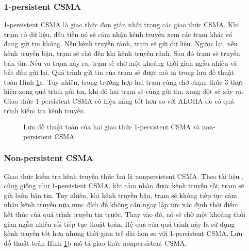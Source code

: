 \subsubsection{1-persistent CSMA}
1-persistent CSMA \cite{6} là giao thức đơn giản nhất trong các giao thức CSMA. Khi trạm có dữ liệu, đầu tiền nó sẽ cảm nhận kênh truyền xem các trạm khác có đang gửi tin không. Nếu kênh truyền rảnh, trạm sẽ gửi dữ liệu. Ngược lại, nếu kênh truyền bận, trạm sẽ chờ đến khi kênh truyền rảnh. Sau đó trạm sẽ truyền bản tin. Nếu va trạm xảy ra, trạm sẽ chờ một khoảng thời gian ngẫu nhiêu và bắt đầu gửi lại. Quá trình gửi tin của trạm sẽ được mô tả trong lưu đồ thuật toán Hình \ref{2CSMA}{}a. Tuy nhiên, trong trường hợp hai trạm cùng chờ chạm thức 3 thực hiện xong quá trình gửi tin, khi đó hai trạm sẽ cùng gửi tin, xung đột sẽ xảy ra. Giao thức 1-persistent CSMA có hiệu năng tốt hơn so với ALOHA do có quá trình kiểm tra kênh truyền.\\
\begin{figure}[h]
\centering
{}
\hfill
{}
\caption{Lưu đồ thuật toán của hai giao thức 1-persistent CSMA và non-persistent CSMA}
\label{2CSMA}
\end{figure} 
\subsubsection{Non-persistent CSMA}
Giao thức kiểm tra kênh truyền thức hai là nonpersistent CSMA. Theo tài liệu \cite{6}, cũng giống như 1-persistent CSMA, khi cảm nhận được kênh truyền rỗi, trạm sẽ gửi luôn bản tin. Tuy nhiên, khi kênh truyền bận, trạm sẽ không tiếp tục cảm nhận kênh truyền nữa mục đích để không cần ngay lập tức xác định thời điểm kết thúc của quá trình truyền tin trước. Thay vào đó, nó sẽ chờ một khoảng thời gian ngẫu nhiên rồi tiếp tục thuật toán. Hệ quả của quá trình này là sử dụng kênh truyền tốt hơn nhưng thời gian trễ dài hơn so với 1-persistent CSMA. Lưu đồ thuật toán Hình \ref{2CSMA}{}b mô tả giao thức nonpersistent CSMA.
